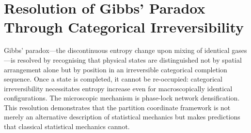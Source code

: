 \chapter{Resolution of Gibbs' Paradox Through Categorical Irreversibility}
\label{ch:gibbs}


\begin{chapterabstract}
Gibbs' paradox---the discontinuous entropy change upon mixing of identical gases---is resolved by recognising that physical states are distinguished not by spatial arrangement alone but by position in an irreversible categorical completion sequence. Once a state is completed, it cannot be re-occupied: categorical irreversibility necessitates entropy increase even for macroscopically identical configurations. The microscopic mechanism is phase-lock network densification. This resolution demonstrates that the partition coordinate framework is not merely an alternative description of statistical mechanics but makes predictions that classical statistical mechanics cannot.
\end{chapterabstract}


